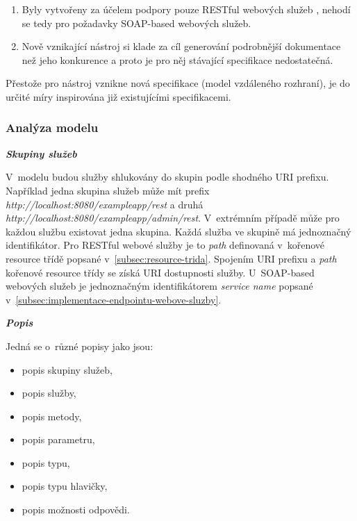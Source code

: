 \documentclass[11pt,twoside,a4paper]{book}
\begin{document}
\begin{enumerate}
  \item Byly vytvořeny za účelem podpory pouze RESTful webových služeb , nehodí
  se tedy pro požadavky SOAP-based webových služeb.
  \item Nově vznikající nástroj si klade za cíl generování podrobnější dokumentace než jeho
konkurence a proto je pro něj stávající specifikace nedostatečná.
\end{enumerate}

Přestože pro nástroj vznikne nová specifikace (model vzdáleného rozhraní), je do
určité míry inspirována již existujícími specifikacemi.

\subsubsection{Analýza modelu}

\textbf{\textit{Skupiny služeb}}

V~modelu budou služby shlukovány do skupin podle shodného URI prefixu. Například jedna
skupina služeb může mít prefix {\em http://localhost:8080/exampleapp/rest} a
druhá {\em http://localhost:8080/exampleapp/admin/rest}. V~extrémním případě
může pro každou službu existovat jedna skupina. Každá služba ve skupině má jednoznačný
identifikátor. Pro RESTful webové služby je to {\em path} definovaná v~kořenové
resource třídě popsané v~\ref{subsec:resource-trida}. Spojením URI prefixu a
{\em path} kořenové resource třídy se získá URI dostupnosti služby. U~SOAP-based
webových služeb je jednoznačným identifikátorem {\em service name} popsané
v~\ref{subsec:implementace-endpointu-webove-sluzby}.

\textbf{\textit{Popis}}

Jedná se o~různé popisy jako jsou:

\begin{itemize}
  \item popis skupiny služeb,
  
  \item popis služby,
  
  \item popis metody,
  
  \item popis parametru,
  
  \item popis typu,
  
  \item popis typu hlavičky,
  
  \item popis možnosti odpovědi.
\end{itemize}
\end{document}
